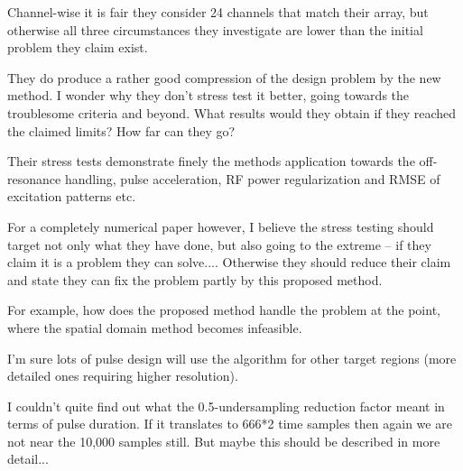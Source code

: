 \documentclass[11pt]{article}
\begin{document}
Channel-wise it is fair they consider 24 channels that match their array, but otherwise all three circumstances they investigate are lower than the initial problem they claim exist.

They do produce a rather good compression of the design problem by the new method. I wonder why they don't stress test it better, going towards the troublesome criteria and beyond. What results would they obtain if they reached the claimed limits? How far can they go?

Their stress tests demonstrate finely the methods application towards the off-resonance handling, pulse acceleration, RF power regularization and RMSE of excitation patterns etc.

For a completely numerical paper however, I believe the stress testing should target not only what they have done, but also going to the extreme -- if they claim it is a problem they can solve.... Otherwise they should reduce their claim and state they can fix the problem partly by this proposed method.

For example, how does the proposed method handle the problem at the point, where the spatial domain method becomes infeasible.

I'm sure lots of pulse design will use the algorithm for other target regions (more detailed ones requiring higher resolution).

I couldn't quite find out what the 0.5-undersampling reduction factor meant in terms of pulse duration. If it translates to 666*2 time samples then again we are not near the 10,000 samples still. But maybe this should be described in more detail...
\\[0.2em]
\indent{\it \textcolor{blue}{The pulse design problem we evaluated in this work
did lead to very long compute times for the spatial domain designs and very large matrix sizes for an explicit pseudoinverse design,
so we believe the problem does represent a challenging but practical design scenario with which to evaluate the new method. 
At the same time, we appreciate that the paper would be strengthened by adding information about how the k-space method's 
performance depends on problem size,
so we now report computation time for spatial and k-space domain designs for each reduction factor in Figure 8. 
We have also revised the max number of time points we cite in the Introduction from 10,000 down to 2,500, 
since even for the finest RF sampling time we know of on a major vendor scanner (4 us on GE), 
a 2,500-time point pulse is fairly long at 10 ms. 
We have added description to clarify how the SPINS trajectory was undersampled,
which was by reducing (or increasing, in the reduction factor 0.5 case) the number of cycles in each of the three trajectory segments.
We also now list the pulse durations for each reduction factor.}}
\\[1.2em]
\end{document}
